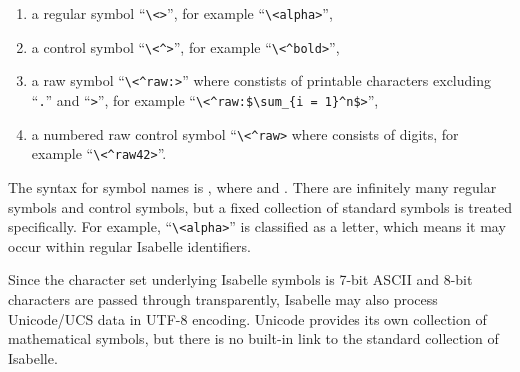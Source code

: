 \begin{isabellebody}
\begin{isamarkuptext}
\begin{enumerate}
  \item a regular symbol ``\verb,\,\verb,<,\verb,>,'',
  for example ``\verb,\,\verb,<alpha>,'',

  \item a control symbol ``\verb,\,\verb,<^,\verb,>,'',
  for example ``\verb,\,\verb,<^bold>,'',

  \item a raw symbol ``\verb,\,\verb,<^raw:,\verb,>,''
  where  constists of printable characters excluding
  ``\verb,.,'' and ``\verb,>,'', for example
  ``\verb,\,\verb,<^raw:$\sum_{i = 1}^n$>,'',

  \item a numbered raw control symbol ``\verb,\,\verb,<^raw,\verb,>, where  consists of digits, for example
  ``\verb,\,\verb,<^raw42>,''.

  \end{enumerate}

  \noindent The  syntax for symbol names is , where  and .  There are infinitely many
  regular symbols and control symbols, but a fixed collection of
  standard symbols is treated specifically.  For example,
  ``\verb,\,\verb,<alpha>,'' is classified as a letter, which means it
  may occur within regular Isabelle identifiers.

  Since the character set underlying Isabelle symbols is 7-bit ASCII
  and 8-bit characters are passed through transparently, Isabelle may
  also process Unicode/UCS data in UTF-8 encoding.  Unicode provides
  its own collection of mathematical symbols, but there is no built-in
  link to the standard collection of Isabelle.


\end{isamarkuptext}
\end{isabellebody}
